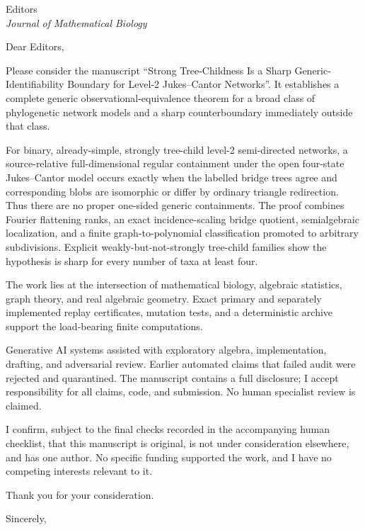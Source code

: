 \documentclass[11pt]{letter}
\date{August 2026}
\begin{document}
\begin{letter}{Editors\\\textit{Journal of Mathematical Biology}}
\opening{Dear Editors,}

Please consider the manuscript ``Strong Tree-Childness Is a Sharp
Generic-Identifiability Boundary for Level-2 Jukes--Cantor Networks''.  It
establishes a complete generic observational-equivalence theorem for a broad
class of phylogenetic network models and a sharp counterboundary immediately
outside that class.

For binary, already-simple, strongly tree-child level-2 semi-directed
networks, a source-relative full-dimensional regular containment under the
open four-state Jukes--Cantor model occurs exactly when the labelled bridge
trees agree and corresponding blobs are isomorphic or differ by ordinary
triangle redirection.  Thus there are no proper one-sided generic
containments.  The proof combines Fourier flattening ranks, an exact
incidence-scaling bridge quotient, semialgebraic localization, and a finite
graph-to-polynomial classification promoted to arbitrary subdivisions.
Explicit weakly-but-not-strongly tree-child families show the hypothesis is
sharp for every number of taxa at least four.

The work lies at the intersection of mathematical biology, algebraic
statistics, graph theory, and real algebraic geometry.  Exact primary and
separately implemented replay certificates, mutation tests, and a
deterministic archive support the load-bearing finite computations.

Generative AI systems assisted with exploratory algebra, implementation,
drafting, and adversarial review.  Earlier automated claims that failed audit
were rejected and quarantined.  The manuscript contains a full disclosure;
I accept responsibility for all claims, code, and submission.  No human
specialist review is claimed.

I confirm, subject to the final checks recorded in the accompanying human
checklist, that this manuscript is original, is not under consideration
elsewhere, and has one author.  No specific funding supported the work, and I
have no competing interests relevant to it.

Thank you for your consideration.

\closing{Sincerely,}
\end{letter}
\end{document}
